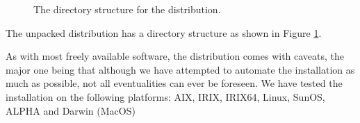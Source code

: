 \documentclass[12pt,twoside]{article}
\begin{document}
\begin{figure}[!ht]

\caption[Directory structure]{%
\label{page:dirtree}
\label{fig:dirtree} %
The directory structure for the \healpix distribution. }
\end{figure}

The unpacked distribution has a directory structure as shown in Figure
\ref{fig:dirtree}.

As with most freely available software, the distribution
comes with caveats, the major one being that although we have attempted
to automate the installation as much as possible, not all eventualities
can ever be foreseen. We have tested the installation on the following 
platforms: \hfill\newline
\noindent AIX, IRIX, IRIX64, Linux, SunOS, ALPHA and Darwin (MacOS) \hfill\newline
\end{document}
